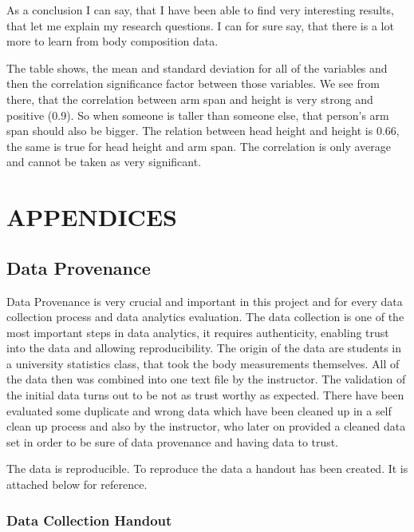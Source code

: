 \documentclass[]{article}
\begin{document}
As a conclusion I can say, that I have been able to find very
interesting results, that let me explain my research questions. I can
for sure say, that there is a lot more to learn from body composition
data.

\newpage



The table shows, the mean and standard deviation for all of the
variables and then the correlation significance factor between those
variables. We see from there, that the correlation between arm span and
height is very strong and positive (0.9). So when someone is taller than
someone else, that person's arm span should also be bigger. The relation
between head height and height is 0.66, the same is true for head height
and arm span. The correlation is only average and cannot be taken as
very significant.

\newpage

\section{APPENDICES}
\label{sec:appendix}

\subsection{Data Provenance}
\label{sec:appendix-data-provenance}

Data Provenance is very crucial and important in this project and for
every data collection process and data analytics evaluation. The data
collection is one of the most important steps in data analytics, it
requires authenticity, enabling trust into the data and allowing
reproducibility. The origin of the data are students in a university
statistics class, that took the body measurements themselves. All of the
data then was combined into one text file by the instructor. The
validation of the initial data turns out to be not as trust worthy as
expected. There have been evaluated some duplicate and wrong data which
have been cleaned up in a self clean up process and also by the
instructor, who later on provided a cleaned data set in order to be sure
of data provenance and having data to trust.

The data is reproducible. To reproduce the data a handout has been
created. It is attached below for reference.

\newpage
\subsubsection{Data Collection Handout}
\label{sec:appendix-data-handout}
\end{document}
